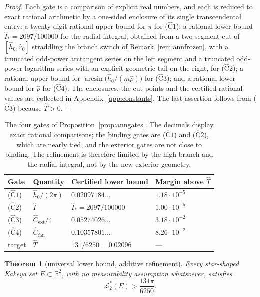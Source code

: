\documentclass[11pt]{article}
\theoremstyle{plain}
\newtheorem{theorem}{Theorem}[section]
\theoremstyle{definition}
\theoremstyle{remark}
\newcommand{\R}{\mathbb{R}}
\newcommand{\Lout}{\mathcal{L}^{*}_{2}}
\begin{document}
\begin{proof}
Each gate is a comparison of explicit real numbers, and each is reduced to
exact rational arithmetic by a one-sided enclosure of its single
transcendental entry: a twenty-digit rational upper bound for $\pi$ for
($\widehat{\mathrm{C}}1$); a rational lower bound $\hat I_{*}=2097/100000$ for
the radial integral, obtained from a two-segment cut of $[\hat h_{0},\hat
r_{0}]$ straddling the branch switch of Remark~\ref{rem:annfrozen}, with a
truncated odd-power arctangent series on the left segment and a truncated
odd-power logarithm series with an explicit geometric tail on the right, for
($\widehat{\mathrm{C}}2$); a rational upper bound for
$\arcsin\bigl(\hat h_{0}/(m\hat\rho)\bigr)$ for ($\widehat{\mathrm{C}}3$); and
a rational lower bound for $\hat\rho$ for ($\widehat{\mathrm{C}}4$). The
enclosures, the cut points and the certified rational values are collected in
Appendix~\ref{app:constants}. The last assertion follows from
($\widehat{\mathrm{C}}3$) because $\hat T>0$.
\end{proof}

\begin{table}[t]
\centering
\small
\begin{tabular}{@{}llll@{}}
\toprule
Gate & Quantity & Certified lower bound & Margin above $\hat T$ \\
\midrule
($\widehat{\mathrm{C}}1$) & $\hat h_{0}/(2\pi)$ & $0.02097184\ldots$
  & $1.18\cdot10^{-5}$\\
($\widehat{\mathrm{C}}2$) & $\hat I$ & $\hat I_{*}=2097/100000$
  & $1.00\cdot10^{-5}$\\
($\widehat{\mathrm{C}}3$) & $\hat C_{\mathrm{ext}}/4$ & $0.05274026\ldots$
  & $3.18\cdot10^{-2}$\\
($\widehat{\mathrm{C}}4$) & $\hat C_{\mathrm{fan}}$ & $0.10357801\ldots$
  & $8.26\cdot10^{-2}$\\
\midrule
target & $\hat T$ & $131/6250=0.02096$ & ---\\
\bottomrule
\end{tabular}
\caption{The four gates of Proposition~\ref{prop:anngates}. The decimals
display exact rational comparisons; the binding gates are
($\widehat{\mathrm{C}}1$) and ($\widehat{\mathrm{C}}2$), which are nearly tied,
and the exterior gates are not close to binding. The refinement is therefore
limited by the high branch and the radial integral, not by the new exterior
geometry.}
\label{tab:anngates}
\end{table}

\begin{theorem}[universal lower bound, additive refinement]\label{thm:annular}
Every star-shaped Kakeya set $E\subset\R^{2}$, with no measurability assumption
whatsoever, satisfies
\[
  \Lout(E)>\frac{131\pi}{6250}.
\]
\end{theorem}
\end{document}
